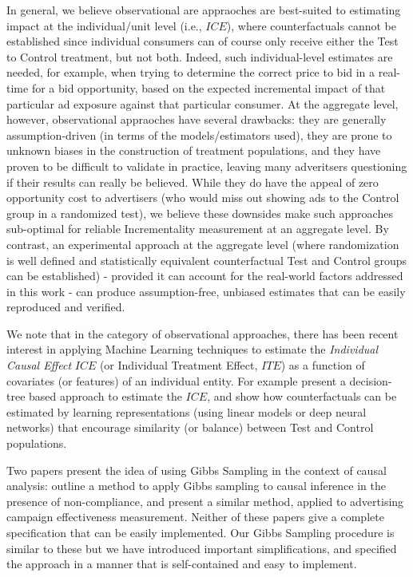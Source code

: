 \documentclass[11pt,a4paper]{article}
\theoremstyle{definition}
\theoremstyle{remark}
\theoremstyle{definition}
\theoremstyle{definition}
\theoremstyle{definition}
\theoremstyle{definition}
\theoremstyle{definition}
\theoremstyle{definition}
\begin{document}
In general, we believe observational are appraoches are best-suited to estimating impact at the individual/unit level (i.e., $ICE$), where counterfactuals cannot be established since individual consumers can of course only receive either the Test to Control treatment, but not both. Indeed, such individual-level estimates are needed, for example, when trying to determine the correct price to bid in a real-time for a bid opportunity, based on the expected incremental impact of that particular ad exposure against that particular consumer. At the aggregate level, however, observational appraoches have several drawbacks: they are generally assumption-driven (in terms of the models/estimators used), they are prone to unknown biases in the construction of treatment populations, and they have proven to be difficult to validate in practice, leaving many adveritsers questioning if their results can really be believed. While they do have the appeal of zero opportunity cost to advertisers (who would miss out showing ads to the Control group in a randomized test), we believe these downsides make such approaches sub-optimal for reliable Incrementality measurement at an aggregate level. By contrast, an experimental approach at the aggregate level (where randomization is well defined and statistically equivalent counterfactual Test and Control groups can be established) - provided it can account for the real-world factors addressed in this work - can produce assumption-free, unbiased estimates that can be easily reproduced and verified.

 We note that in the category of observational approaches, there has been recent interest in applying Machine Learning techniques to estimate the \textit{Individual Causal Effect} $ICE$ (or Individual Treatment Effect, $ITE$) as a function of covariates (or features) of an individual entity. For example \cite{athey2016recursive, Athey2015} present a decision-tree based approach to estimate the $ICE$, and \cite{johansson2016learning} show how counterfactuals can be estimated by learning representations (using linear models or deep neural networks) that encourage similarity (or balance) between Test and Control populations.



Two papers present the idea of using Gibbs Sampling in the context of causal analysis: \cite{Chickering1996} outline a method to apply Gibbs sampling to causal inference in the presence of non-compliance, and \cite{Barajas2012} present a similar method, applied to advertising campaign effectiveness measurement. Neither of these papers give a complete specification that can be easily implemented. Our Gibbs Sampling procedure is similar to these but we have introduced important simplifications, and specified the approach in a manner that is self-contained and easy to implement.
\end{document}
